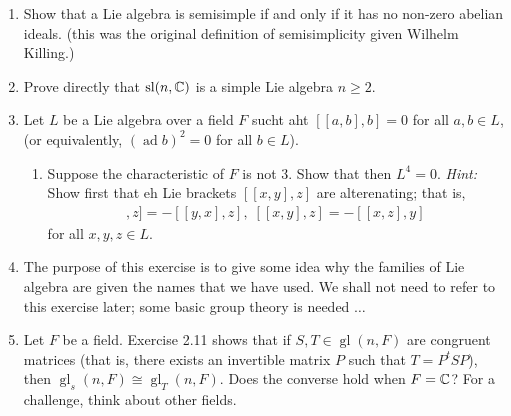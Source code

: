 \documentclass[12pt,a4paper]{report}
\newcommand{\GL}{\operatorname{gl}}
\newcommand{\SL}{\operatorname{sl}}
\newcommand{\AD}{\operatorname{ad}}
\begin{document}
\begin{enumerate}[label=4.\arabic*]
\begin{enumerate}[label=(\roman*)]
\end{enumerate}

\item Show that a Lie algebra is semisimple if and only if it has no non-zero abelian ideals.  (this was the original definition of semisimplicity given Wilhelm Killing.)

\item Prove directly that $\SL(n,\C)$ is a simple Lie algebra $n \ge 2$.

\item Let $L$ be a Lie algebra over a field $F$ sucht aht $[[a,b],b]=0$ for all $a,b \in L$, (or equivalently, $(\AD b)^2=0$ for all $b \in L$).

\begin{enumerate}[label=(\roman*)]

	\item Suppose the characteristic of $F$ is not 3.  Show that then $L^4 = 0$.  \textit{Hint:}  Show first that eh Lie brackets $[[x,y],z]$ are alterenating; that is, 
	\begin{align*}
		[[x,y],z]=-[[y,x],z],\; [[x,y],z]=-[[x,z],y]
	\end{align*}for all $x,y,z \in L$.

\end{enumerate}

\item The purpose of this exercise is to give some idea why the families of Lie algebra are given the names that we have used.  We shall not need to refer to this exercise later;  some basic group theory is needed $\dots$

\item Let $F$ be a field.  Exercise 2.11 shows that if $S,T \in \GL(n,F)$ are congruent matrices (that is, there exists an invertible matrix $P$ such that $T=P^tSP$), then $\GL_s(n,F) \cong \GL_T(n,F)$.  Does the converse hold when $F = \mathbb{C}$?  For a challenge, think about other fields.
\end{enumerate}
\end{document}
